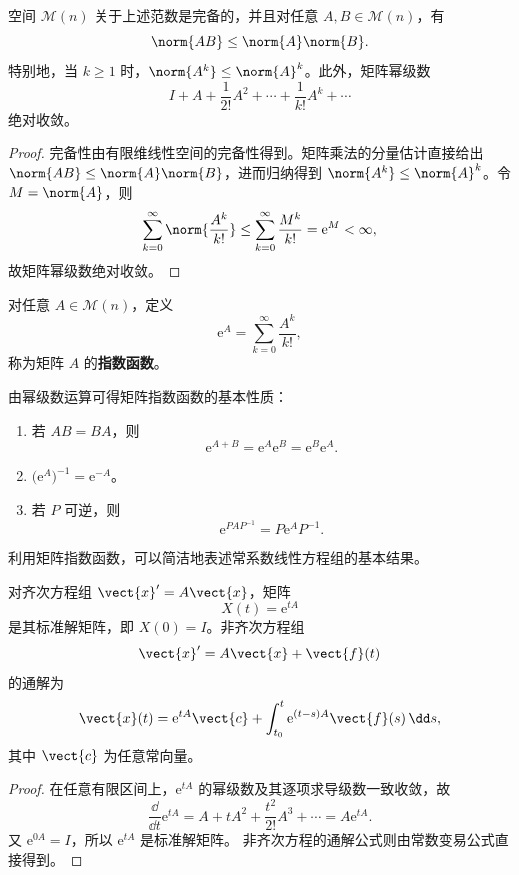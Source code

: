 \begin{lemma}\label{lem:矩阵指数级数的收敛性}
	空间 $\mathscr{M}(n)$ 关于上述范数是完备的，并且对任意
	$A,B\in\mathscr{M}(n)$，有
	\[
		\norm{AB}\leq\norm{A}\norm{B}.
	\]
	特别地，当 $k\geq1$ 时，$\norm{A^k}\leq\norm{A}^k$。此外，矩阵幂级数
	\[
		I+A+\dfrac{1}{2!}A^2+\cdots+\dfrac{1}{k!}A^k+\cdots
	\]
	绝对收敛。
\end{lemma}

\begin{proof}
	完备性由有限维线性空间的完备性得到。矩阵乘法的分量估计直接给出
	$\norm{AB}\leq\norm{A}\norm{B}$，进而归纳得到
	$\norm{A^k}\leq\norm{A}^k$。令 $M=\norm{A}$，则
	\[
		\sum_{k=0}^{\infty}\norm{\dfrac{A^k}{k!}}
		\leq\sum_{k=0}^{\infty}\dfrac{M^k}{k!}
		=\mathrm{e}^{M}<\infty,
	\]
	故矩阵幂级数绝对收敛。
\end{proof}

\begin{definition}\label{def:矩阵指数函数}
	对任意 $A\in\mathscr{M}(n)$，定义
	\[
		\mathrm{e}^{A}=\sum_{k=0}^{\infty}\dfrac{A^k}{k!},
	\]
	称为矩阵 $A$ 的\textbf{指数函数}。
\end{definition}

由幂级数运算可得矩阵指数函数的基本性质：

\begin{enumerate}
	\item 若 $AB=BA$，则
	\[
		\mathrm{e}^{A+B}
		=\mathrm{e}^{A}\mathrm{e}^{B}
		=\mathrm{e}^{B}\mathrm{e}^{A}.
	\]
	\item $\bigl(\mathrm{e}^{A}\bigr)^{-1}=\mathrm{e}^{-A}$。
	\item 若 $P$ 可逆，则
	\[
		\mathrm{e}^{PAP^{-1}}=P\mathrm{e}^{A}P^{-1}.
	\]
\end{enumerate}

利用矩阵指数函数，可以简洁地表述常系数线性方程组的基本结果。

\begin{theorem}\label{thm:常系数线性方程组的矩阵指数解}
	对齐次方程组 $\vect{x}'=A\vect{x}$，矩阵
	\[
		X(t)=\mathrm{e}^{tA}
	\]
	是其标准解矩阵，即 $X(0)=I$。非齐次方程组
	\[
		\vect{x}'=A\vect{x}+\vect{f}(t)
	\]
	的通解为
	\[
		\vect{x}(t)
		=\mathrm{e}^{tA}\vect{c}
		+\int_{t_0}^{t}\mathrm{e}^{(t-s)A}\vect{f}(s)\,\dd s,
	\]
	其中 $\vect{c}$ 为任意常向量。
\end{theorem}

\begin{proof}
	在任意有限区间上，$\mathrm{e}^{tA}$ 的幂级数及其逐项求导级数一致收敛，故
	\[
		\dfrac{\dd}{\dd t}\mathrm{e}^{tA}
		=A+tA^2+\dfrac{t^2}{2!}A^3+\cdots
		=A\mathrm{e}^{tA}.
	\]
	又 $\mathrm{e}^{0A}=I$，所以 $\mathrm{e}^{tA}$ 是标准解矩阵。
	非齐次方程的通解公式则由常数变易公式直接得到。
\end{proof}

